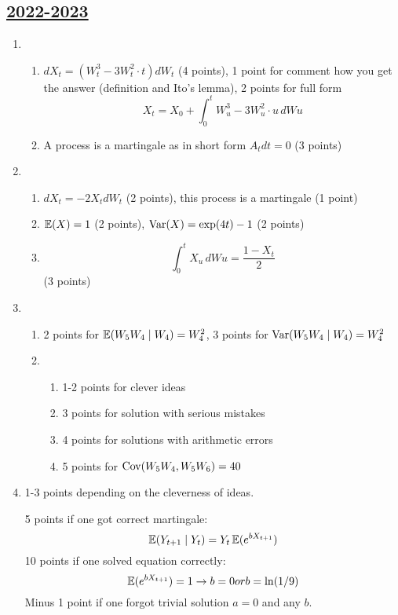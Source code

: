 \subsection[2022-2023]{\hyperref[sec:kr_02_2022_2023]{2022-2023}}
\label{sec:sol_kr_02_2022_2023} %

\begin{enumerate}
\item 
\begin{enumerate}
    \item $dX_t = (W^3_t-3W^2_t\cdot t)dW_t$ (4 points), 1 point for comment how you get the answer (definition and Ito's lemma), 2 points for full form 
    \[ 
    X_t = X_0 + \int_{0}^{t} W^3_u-3W^2_u\cdot u \,dWu
    \]
    \item A process is a martingale as in short form $A_t dt =0$ (3 points)
\end{enumerate}

\item 
\begin{enumerate}
    \item $dX_t=-2X_t dW_t$ (2 points), this process is a martingale (1 point)
    \item $\operatorname{\mathbb{E}}(X)=1$ (2 points), $\operatorname{Var}(X)=\exp(4t)-1$ (2 points)
    \item \[ \int_{0}^{t} X_u\,dWu = \frac{1-X_t}{2}\] (3 points)
\end{enumerate}

\item \begin{enumerate}
    \item 2 points for $\operatorname{\mathbb{E}}(W_5 W_4 \mid W_4) = W_4^2$, 3 points for $\operatorname{Var}(W_5 W_4 \mid W_4) = W_4^2$
    \item \begin{enumerate}
        \item 1-2 points for clever ideas
        \item 3 points for solution with serious mistakes
        \item 4 points for solutions with arithmetic errors
        \item 5 points for $\operatorname{Cov}(W_5 W_4, W_5 W_6) = 40$
    \end{enumerate}
\end{enumerate}

\item
 1-3 points depending on the cleverness of ideas.
 
 5 points if one got correct martingale:
 \[
 \operatorname{\mathbb{E}}(Y_{t+1} \mid Y_t) = Y_t \operatorname{\mathbb{E}}(e^{b X_{t+1}})
 \]    
10 points if one solved equation correctly:
\[
\operatorname{\mathbb{E}}(e^{b X_{t+1}}) = 1 \rightarrow b = 0 or b = \ln(1/9)
\]
Minus 1 point if one forgot trivial solution $a = 0$ and any $b$.


\end{enumerate}
